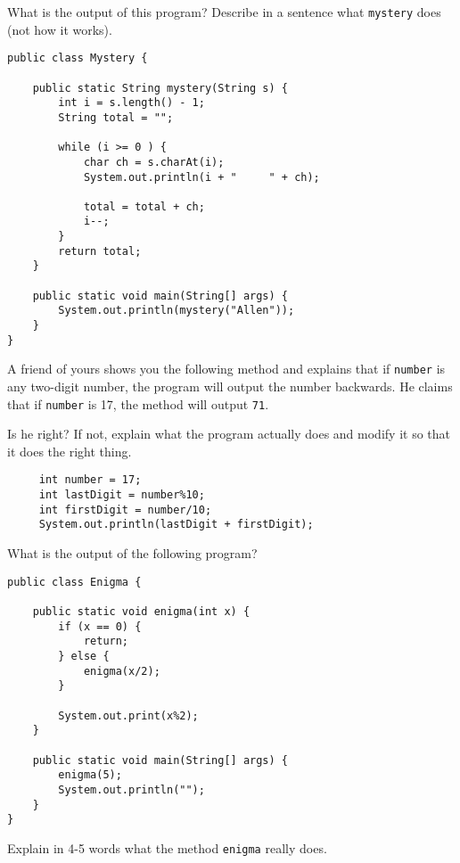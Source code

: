 \begin{exercise}

What is the output of this program?  Describe in a sentence
what {\tt mystery} does (not how it works).

\begin{lstlisting}
public class Mystery {

    public static String mystery(String s) {
        int i = s.length() - 1;
        String total = "";

        while (i >= 0 ) {
            char ch = s.charAt(i);
            System.out.println(i + "     " + ch);

            total = total + ch;
            i--;
        }
        return total;
    }

    public static void main(String[] args) {
        System.out.println(mystery("Allen"));
    }
}
\end{lstlisting}

\end{exercise}


\begin{exercise}
A friend of yours shows you the following method and
explains that if {\tt number} is any two-digit number, the program
will output the number backwards.  He claims that if {\tt number} is
17, the method will output {\tt 71}.

Is he right?  If not, explain what the program actually does and
modify it so that it does the right thing.

\begin{lstlisting}
     int number = 17;
     int lastDigit = number%10;
     int firstDigit = number/10;
     System.out.println(lastDigit + firstDigit);
\end{lstlisting}

\end{exercise}

\begin{exercise}
What is the output of the following program?

\begin{lstlisting}
public class Enigma {

    public static void enigma(int x) {
        if (x == 0) {
            return;
        } else {
            enigma(x/2);
        }

        System.out.print(x%2);
    }

    public static void main(String[] args) {
        enigma(5);
        System.out.println("");
    }
}
\end{lstlisting}

Explain in 4-5 words what the method {\tt enigma} really does.
\end{exercise}


